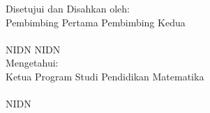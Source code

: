 \begin{pengesahan}


  
{ \Large \ttitle\par} %
\vfill

{ Disetujui dan Disahkan oleh:}\\ %
{ Pembimbing Pertama}
\hfill {  Pembimbing Kedua}\\ 
[18mm]


{  \underline{\pembimbingPertamaTulis}}
\hfill { \underline{\pembimbingKeduaTulis}}\\[0.8mm]
{ NIDN \nikPembimbingPertamaTulis}
\hfill { NIDN \nikPembimbingKeduaTulis}\\[0.8mm]

\vfill
{ Mengetahui:}\\ 
{ Ketua Program Studi Pendidikan Matematika} \\ [18mm]


{ \underline{\kaProdiTulis}}\\[0.8mm]
{ NIDN \nikKaProdiTulis} \\





\end{pengesahan}

